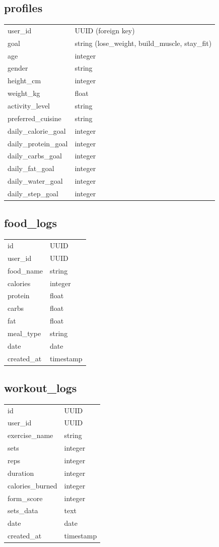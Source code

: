 \documentclass[12pt]{report}
\begin{document}
\subsection*{profiles}
\begin{tabular}{|l|l|}
\hline
user\_id & UUID (foreign key) \\
goal & string (lose\_weight, build\_muscle, stay\_fit) \\
age & integer \\
gender & string \\
height\_cm & integer \\
weight\_kg & float \\
activity\_level & string \\
preferred\_cuisine & string \\
daily\_calorie\_goal & integer \\
daily\_protein\_goal & integer \\
daily\_carbs\_goal & integer \\
daily\_fat\_goal & integer \\
daily\_water\_goal & integer \\
daily\_step\_goal & integer \\ \hline
\end{tabular}

\subsection*{food\_logs}
\begin{tabular}{|l|l|}
\hline
id & UUID \\
user\_id & UUID \\
food\_name & string \\
calories & integer \\
protein & float \\
carbs & float \\
fat & float \\
meal\_type & string \\
date & date \\
created\_at & timestamp \\ \hline
\end{tabular}

\subsection*{workout\_logs}
\begin{tabular}{|l|l|}
\hline
id & UUID \\
user\_id & UUID \\
exercise\_name & string \\
sets & integer \\
reps & integer \\
duration & integer \\
calories\_burned & integer \\
form\_score & integer \\
sets\_data & text \\
date & date \\
created\_at & timestamp \\ \hline
\end{tabular}
\end{document}
